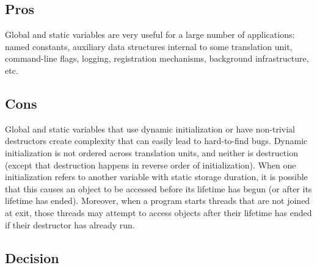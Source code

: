 \subsection{Pros}
Global and static variables are very useful for a large number of applications: named constants, auxiliary data structures internal to some translation unit, command-line flags, logging, registration mechanisms, background infrastructure, etc.

\subsection{Cons}
Global and static variables that use dynamic initialization or have non-trivial destructors create complexity that can easily lead to hard-to-find bugs. Dynamic initialization is not ordered across translation units, and neither is destruction (except that destruction happens in reverse order of initialization). When one initialization refers to another variable with static storage duration, it is possible that this causes an object to be accessed before its lifetime has begun (or after its lifetime has ended). Moreover, when a program starts threads that are not joined at exit, those threads may attempt to access objects after their lifetime has ended if their destructor has already run.

\subsection{Decision}
